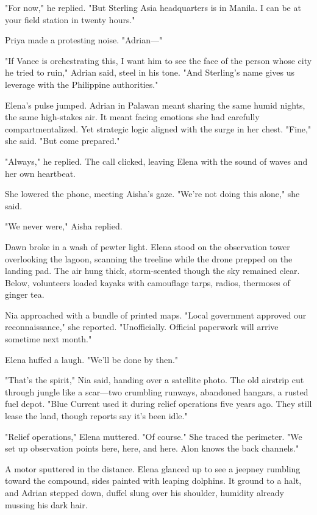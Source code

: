 "For now," he replied. "But Sterling Asia headquarters is in Manila. I can be at your field station in twenty hours."

Priya made a protesting noise. "Adrian—"

"If Vance is orchestrating this, I want him to see the face of the person whose city he tried to ruin," Adrian said, steel in his tone. "And Sterling's name gives us leverage with the Philippine authorities."

Elena's pulse jumped. Adrian in Palawan meant sharing the same humid nights, the same high-stakes air. It meant facing emotions she had carefully compartmentalized. Yet strategic logic aligned with the surge in her chest. "Fine," she said. "But come prepared."

"Always," he replied. The call clicked, leaving Elena with the sound of waves and her own heartbeat.

She lowered the phone, meeting Aisha's gaze. "We're not doing this alone," she said.

"We never were," Aisha replied.

\bigskip

Dawn broke in a wash of pewter light. Elena stood on the observation tower overlooking the lagoon, scanning the treeline while the drone prepped on the landing pad. The air hung thick, storm-scented though the sky remained clear. Below, volunteers loaded kayaks with camouflage tarps, radios, thermoses of ginger tea.

Nia approached with a bundle of printed maps. "Local government approved our reconnaissance," she reported. "Unofficially. Official paperwork will arrive sometime next month."

Elena huffed a laugh. "We'll be done by then."

"That's the spirit," Nia said, handing over a satellite photo. The old airstrip cut through jungle like a scar—two crumbling runways, abandoned hangars, a rusted fuel depot. "Blue Current used it during relief operations five years ago. They still lease the land, though reports say it's been idle."

"Relief operations," Elena muttered. "Of course." She traced the perimeter. "We set up observation points here, here, and here. Alon knows the back channels."

A motor sputtered in the distance. Elena glanced up to see a jeepney rumbling toward the compound, sides painted with leaping dolphins. It ground to a halt, and Adrian stepped down, duffel slung over his shoulder, humidity already mussing his dark hair.

